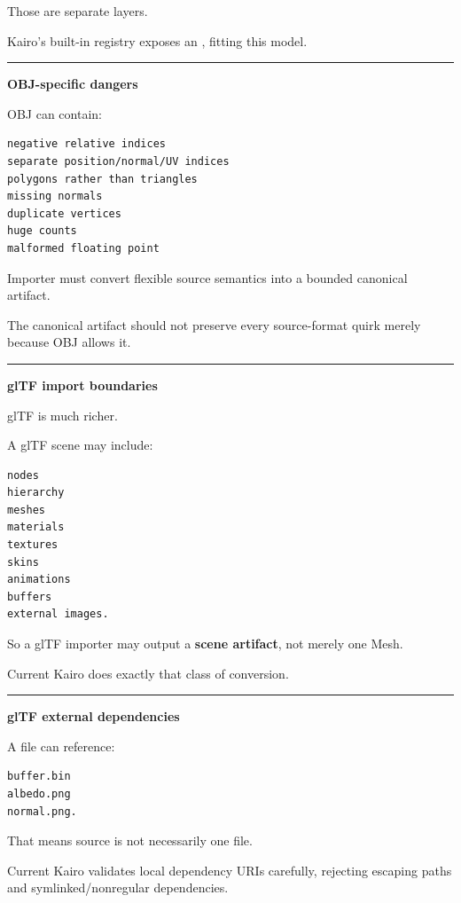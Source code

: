 Those are separate layers.

Kairo's built-in registry exposes an , fitting this model.

\begin{center}\rule{0.5\linewidth}{0.5pt}\end{center}

\textbf{OBJ-specific dangers}

OBJ can contain:

\begin{verbatim}
negative relative indices
separate position/normal/UV indices
polygons rather than triangles
missing normals
duplicate vertices
huge counts
malformed floating point
\end{verbatim}

Importer must convert flexible source semantics into a bounded canonical artifact.

The canonical artifact should not preserve every source-format quirk merely because OBJ allows it.

\begin{center}\rule{0.5\linewidth}{0.5pt}\end{center}

\textbf{glTF import boundaries}

glTF is much richer.

A glTF scene may include:

\begin{verbatim}
nodes
hierarchy
meshes
materials
textures
skins
animations
buffers
external images.
\end{verbatim}

So a glTF importer may output a \textbf{scene artifact}, not merely one Mesh.

Current Kairo  does exactly that class of conversion.

\begin{center}\rule{0.5\linewidth}{0.5pt}\end{center}

\textbf{glTF external dependencies}

A  file can reference:

\begin{verbatim}
buffer.bin
albedo.png
normal.png.
\end{verbatim}

That means source is not necessarily one file.

Current Kairo validates local dependency URIs carefully, rejecting escaping paths and symlinked/nonregular dependencies.

